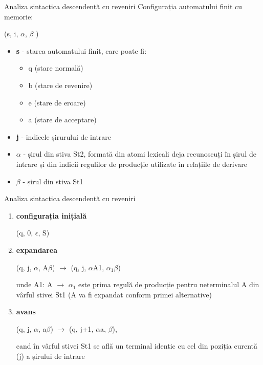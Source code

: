 \documentclass[pdf]{beamer}
\begin{document}
\begin{frame}{Analiza sintactica descendentă cu reveniri}
Configurația automatului finit cu memorie:

(s, i, $\alpha$, $\beta$ )

\begin{itemize}
\item
\textbf{s} - starea automatului finit, care poate fi:

\begin{itemize}
\item
q (stare normală)
\item
b (stare de revenire)

\item
e (stare de eroare)

\item
a (stare de acceptare) 
\end{itemize}

\item
\textbf{j} - indicele șirurului de intrare

\item
\textbf{$\alpha$} - șirul din  stiva St2, formată din atomi lexicali deja recunoscuți în șirul de intrare și din indicii regulilor de producție utilizate în relațiile de derivare

\item
\textbf{$\beta$} - șirul din stiva St1
\end{itemize}
\end{frame}



\begin{frame}{Analiza sintactica descendentă cu reveniri}
\begin{enumerate}
\item 
\textbf{configurația inițială}

(q, 0, $\epsilon$, S)

\item 
\textbf{expandarea}

(q, j, $\alpha$, A$\beta$) $\rightarrow$ (q, j, $\alpha$A1, $\alpha_1\beta$)

unde A1: A $\rightarrow$ $\alpha_1$ este prima regulă de producție pentru neterminalul A din vârful stivei St1 (A va fi expandat conform primei alternative)

\item 
\textbf{avans}

(q, j, $\alpha$, a$\beta$) $\rightarrow$ (q, j+1, $\alpha$a, $\beta$), 

cand în vârful stivei St1 se află un terminal identic cu cel din poziția curentă (j) a șirului de intrare

\end{enumerate}
\end{frame}
\end{document}
